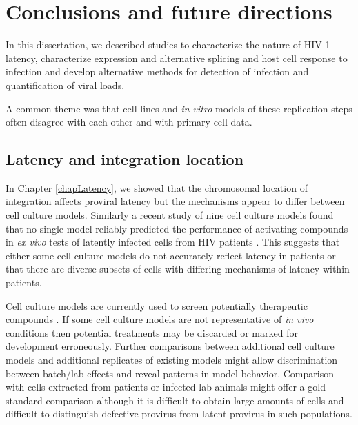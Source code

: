 \documentclass[../sherrill-Mix_thesis.tex]{subfiles}
\begin{document}
\chapter{Conclusions and future directions}
\graphicspath{{im/}{conclusion/im/}}

In this dissertation, we described studies to characterize the nature of HIV-1 latency, characterize expression and alternative splicing and host cell response to infection and develop alternative methods for detection of infection and quantification of viral loads.

A common theme was that cell lines and \textit{in vitro} models of these replication steps often disagree with each other and with primary cell data. 

\section{Latency and integration location}

	In Chapter \ref{chapLatency}, we showed that the chromosomal location of integration affects proviral latency but the mechanisms appear to differ between cell culture models. Similarly a recent study of nine cell culture models found that no single model reliably predicted the performance of activating compounds in \textit{ex vivo} tests of latently infected cells from HIV patients \citep{Spina2013}. This suggests that either some cell culture models do not accurately reflect latency in patients or that there are diverse subsets of cells with differing mechanisms of latency within patients. 

	Cell culture models are currently used to screen potentially therapeutic compounds \citep{Xing2011,Spina2013}. If some cell culture models are not representative of \textit{in vivo} conditions then potential treatments may be discarded or marked for development erroneously. Further comparisons between additional cell culture models and additional replicates of existing models might allow discrimination between batch/lab effects and reveal patterns in model behavior. Comparison with cells extracted from patients or infected lab animals might offer a gold standard comparison although it is difficult to obtain large amounts of cells and difficult to distinguish defective provirus from latent provirus in such populations. %
\end{document}
